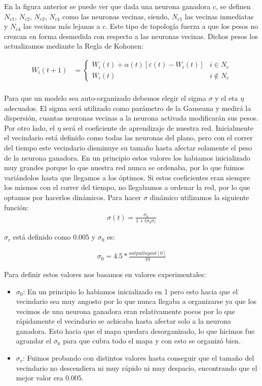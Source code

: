 En la figura anterior se puede ver que dada una neurona ganadora $c$, se definen $N_{c1}$, $N_{c2}$, $N_{c3}$, $N_{c4}$ como las neuronas vecinas, siendo, $N_{c1}$ las vecinas inmediatas y $N_{c4}$ las vecinas más lejanas a $c$. Este tipo de topología fuerza a que los pesos no crezcan en forma desmedida con respecto a las neuronas vecinas. Dichos pesos los actualizamos mediante la Regla de Kohonen:

\begin{align*}
	W_{i}(t+1) &=  \begin{cases}
						W_{i}(t) + \alpha(t) [ \varepsilon(t) - W_{i}(t) ] & i \in N_{c} \\
						W_{i}(t)                                           & i \not \in N_{c}  
					\end{cases} \\
\end{align*}

Para que un modelo sea auto-organizado debemos elegir el sigma $\sigma$ y  el eta $\eta$ adecuados. El sigma será utilizado como parámetro de la Gauseana y medirá la dispersión, cuantas neuronas vecinas a la neurona activada modificarán sus pesos. Por otro lado, el $\eta$ será el coeficiente de aprendizaje de nuestra red. 
Inicialmente el vecindario está definido como todas las neuronas del plano, pero con el correr del tiempo 
este vecindario disminuye su tamaño hasta afectar solamente el peso de la neurona ganadora. En un principio estos valores los habiamos inicializado muy grandes porque lo que nuestra red nunca se ordenaba, por lo que  fuimos variándolos hasta que llegamos a los óptimos. Si estos coeficientes eran siempre los mismos con el correr del tiempo, no llegabamos a ordenar la red, por lo que optamos por hacerlos dinámicos. 
Para hacer $\sigma$ dinámico utilizamos la siguiente función:
\begin{align*}
		\sigma(t) = \frac{\sigma_{0}}{1 + t \sigma_{0} \sigma_{r}} 
\end{align*}

$\sigma_{r}$ está definido como $0.005$ y $\sigma_{0}$ es:

\begin{align*}
		\sigma_{0} = 4.5 * \frac{outputlayout[0]}{10} 
\end{align*}

Para definir estos valores nos basamos en valores experimentales:

\begin{itemize}
	\item $\sigma_{0}$: En un principio lo habiamos inicializado en 1 pero esto hacia que el vecindario sea muy angosto por lo que nunca llegaba a organizarse ya que los vecimos de una neurona ganadora eran relativamente pocos por lo que rápidamente el vecindario se achicaba hasta afectar solo a la neurona ganadora. Esto hacia que el mapa quedara desorganizado, lo que hicimos fue agrandar el $\sigma_{0}$ para que cubra todo el mapa y con esto se organizó bien.
	\item $\sigma_{r}$: Fuimos probando con distintos valores hasta conseguir que el tamaño del vecindario no descendiera ni muy rápido ni muy despacio, encontrando que el mejor valor era $0.005$. 
\end{itemize}	

